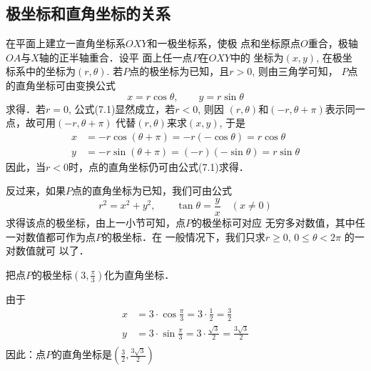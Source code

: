 \subsection{极坐标和直角坐标的关系}

\begin{figure}[htp]
    \centering
{}
    \caption{}
\end{figure}

在平面上建立一直角坐标系$OXY$和一极坐标系，使极
点和坐标原点$O$重合，极轴$OA$与$X$轴的正半轴重合．设平
面上任一点$P$在$OXY$中的
坐标为$(x,y)$, 在极坐
标系中的坐标为$(r,\theta)$. 
若$P$点的极坐标为已知，且$r>0$, 则由三角学可知，
$P$点的直角坐标可由变换公式
\begin{equation}
    x=r\cos\theta,\qquad y=r\sin\theta
\end{equation}
求得．若$r=0$, 公式(7.1)显然成立，若$r<0$, 则因
$(r,\theta)$和$(-r,\theta+\pi)$表示同一点，故可用$(-r,\theta+\pi)$
代替$(r,\theta)$来求$(x,y)$, 于是
\[\begin{split}
    x&=-r\cos(\theta +\pi )=-r(-\cos\theta )=r\cos\theta \\
    y&=-r\sin(\theta +\pi )=(-r)(-\sin\theta )=r\sin\theta 
\end{split}\]
因此，当$r<0$时，点的直角坐标仍可由公式(7.1)求得．

反过来，如果$P$点的直角坐标为已知，我们可由公式
\begin{equation}
    r^2=x^2+y^2,\qquad \tan\theta=\frac{y}{x}\quad (x\ne 0)
\end{equation}
求得该点的极坐标，由上一小节可知，点$P$的极坐标可对应
无穷多对数值，其中任一对数值都可作为点$P$的极坐标．在
一般情况下，我们只求$r\ge 0$, $0\le\theta<2\pi$ 的一对数值就可
以了．

\begin{example}
    把点$P$的极坐标$\left(3,\frac{\pi}{3}\right)$化为直角坐标．
\end{example}

\begin{solution}
    由于
\[\begin{split}
    x&=3\cdot \cos \frac{\pi}{3}=3\cdot \frac{1}{2}=\frac{3}{2}\\
    y&=3\cdot \sin \frac{\pi}{3}=3\cdot \frac{\sqrt{3}}{2}=\frac{3\sqrt{3}}{2}\\
\end{split}\]
因此：点$P$的直角坐标是$\left(\frac{3}{2},\frac{3\sqrt{3}}{2}\right)$
\end{solution}

